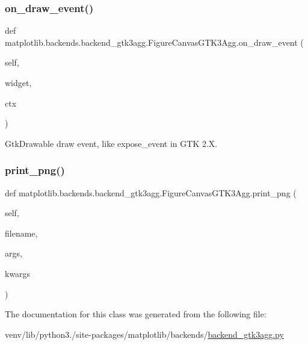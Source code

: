 \subsubsection{\texorpdfstring{on\+\_\+draw\+\_\+event()}{on\_draw\_event()}}
{\footnotesize\ttfamily def matplotlib.\+backends.\+backend\+\_\+gtk3agg.\+Figure\+Canvas\+G\+T\+K3\+Agg.\+on\+\_\+draw\+\_\+event (\begin{DoxyParamCaption}\item[{}]{self,  }\item[{}]{widget,  }\item[{}]{ctx }\end{DoxyParamCaption})}

\begin{DoxyVerb}GtkDrawable draw event, like expose_event in GTK 2.X.\end{DoxyVerb}
 \mbox{\label{classmatplotlib_1_1backends_1_1backend__gtk3agg_1_1FigureCanvasGTK3Agg_ab91d3d29aa1f71251cbc7fc8789971cb}} 
\subsubsection{\texorpdfstring{print\+\_\+png()}{print\_png()}}
{\footnotesize\ttfamily def matplotlib.\+backends.\+backend\+\_\+gtk3agg.\+Figure\+Canvas\+G\+T\+K3\+Agg.\+print\+\_\+png (\begin{DoxyParamCaption}\item[{}]{self,  }\item[{}]{filename,  }\item[{}]{args,  }\item[{}]{kwargs }\end{DoxyParamCaption})}



The documentation for this class was generated from the following file\+:\begin{DoxyCompactItemize}
\item 
venv/lib/python3./site-\/packages/matplotlib/backends/\hyperlink{backend__gtk3agg_8py}{backend\+\_\+gtk3agg.\+py}\end{DoxyCompactItemize}
